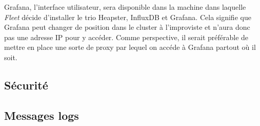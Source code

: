 \begin{onehalfspace}
Grafana, l'interface utilisateur, sera disponible dans la machine dans laquelle \emph{Fleet} décide d'installer le trio Heapster, InfluxDB et Grafana. Cela signifie que Grafana peut changer de position dans le cluster à l'improviste et n'aura donc pas une adresse IP pour y accéder. Comme perspective, il serait préférable de mettre en place une sorte de proxy par lequel on accéde à Grafana partout où il soit.

\subsection{Sécurité}


\subsection{Messages logs}



\end{onehalfspace}
